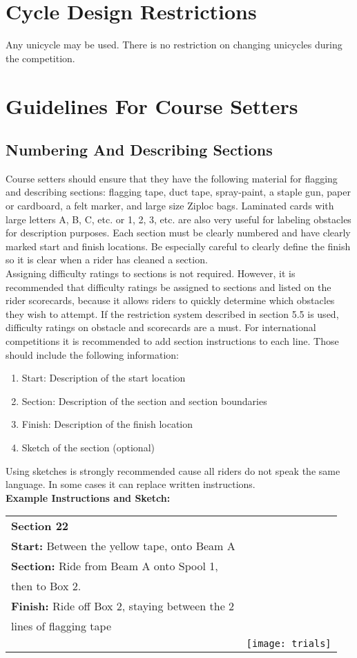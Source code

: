 \section{Cycle Design Restrictions}
Any unicycle may be used. There is no restriction on changing unicycles during the competition.
\section{Guidelines For Course Setters}
\subsection{Numbering And Describing Sections}
Course setters should ensure that they have the following material for flagging and describing sections: flagging tape,
duct tape, spray-paint, a staple gun, paper or cardboard, a felt marker, and large size Ziploc bags. Laminated cards with
large letters A, B, C, etc. or 1, 2, 3, etc. are also very useful for labeling obstacles for description purposes.
Each section must be clearly numbered and have clearly marked start and finish locations. Be especially careful to
clearly define the finish so it is clear when a rider has cleaned a section.\\
Assigning difficulty ratings to sections is not required. However, it is recommended that difficulty ratings be assigned
to sections and listed on the rider scorecards, because it allows riders to quickly determine which obstacles they wish to
attempt. If the restriction system described in section 5.5 is used, difficulty ratings on obstacle and scorecards are a
must. For international competitions it is recommended to add section instructions to each line. Those should include
the following information:\\
\begin{enumerate}
\item  Start: Description of the start location
\item Section: Description of the section and section boundaries
\item Finish: Description of the finish location
\item Sketch of the section (optional)
\end{enumerate}
Using sketches is strongly recommended cause all riders do not speak the same language. In some cases it can replace written instructions.\\
\textbf{Example Instructions and Sketch:}
\\
\begin{tabular}{|l r |}
\hline 
\textbf{Section 22} \\
\textbf{Start:} Between the yellow tape, onto Beam A\\
\textbf{Section:} Ride from Beam A onto Spool 1,\\
then to Box 2.\\
\textbf{Finish:} Ride off Box 2, staying between the 2\\
lines of flagging tape\\ & \texttt{[image: trials]} \\ 
 
\hline 
\end{tabular} 


